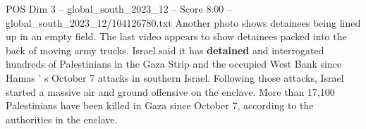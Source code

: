 \begin{textsample}{POS Dim 3 – global\_south\_2023\_12 – Score 8.00 – global\_south\_2023\_12/104126780.txt}
Another photo shows detainees being lined up in an empty field.
The last video appears to show detainees packed into the back of moving army trucks.
Israel said it has \textbf{detained} and interrogated hundreds of Palestinians in the Gaza Strip and the occupied West Bank since Hamas ' s October 7 attacks in southern Israel.
Following those attacks, Israel started a massive air and ground offensive on the enclave.
More than 17,100 Palestinians have been killed in Gaza since October 7, according to the authorities in the enclave.

\end{textsample}
